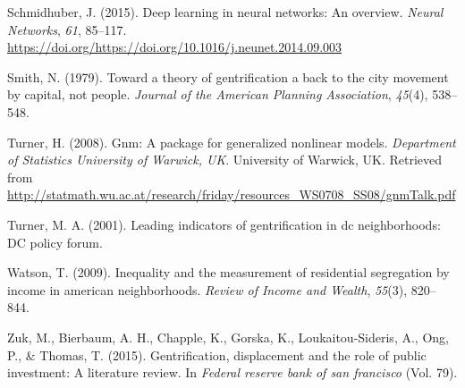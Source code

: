 \documentclass[12pt,]{article}
\begin{document}
\leavevmode\hypertarget{ref-SCHMIDHUBER201585}{}%
Schmidhuber, J. (2015). Deep learning in neural networks: An overview.
\emph{Neural Networks}, \emph{61}, 85--117.
\url{https://doi.org/https://doi.org/10.1016/j.neunet.2014.09.003}

\leavevmode\hypertarget{ref-Smith1979}{}%
Smith, N. (1979). Toward a theory of gentrification a back to the city
movement by capital, not people. \emph{Journal of the American Planning
Association}, \emph{45}(4), 538--548.

\leavevmode\hypertarget{ref-turner_2008}{}%
Turner, H. (2008). Gnm: A package for generalized nonlinear models.
\emph{Department of Statistics University of Warwick, UK}. University of
Warwick, UK. Retrieved from
\url{http://statmath.wu.ac.at/research/friday/resources_WS0708_SS08/gnmTalk.pdf}

\leavevmode\hypertarget{ref-Turner2001}{}%
Turner, M. A. (2001). Leading indicators of gentrification in dc
neighborhoods: DC policy forum.

\leavevmode\hypertarget{ref-Watson2009}{}%
Watson, T. (2009). Inequality and the measurement of residential
segregation by income in american neighborhoods. \emph{Review of Income
and Wealth}, \emph{55}(3), 820--844.

\leavevmode\hypertarget{ref-Zuk2015}{}%
Zuk, M., Bierbaum, A. H., Chapple, K., Gorska, K., Loukaitou-Sideris,
A., Ong, P., \& Thomas, T. (2015). Gentrification, displacement and the
role of public investment: A literature review. In \emph{Federal reserve
bank of san francisco} (Vol. 79).
\end{document}
